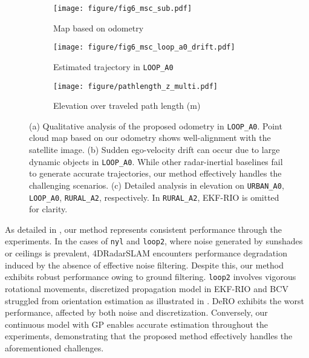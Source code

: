 \begin{figure*}[!t]
    \centering
    \hspace{1mm}
     \begin{subfigure}[b]{0.2\textwidth}
        \centering
        \texttt{[image: figure/fig6\_msc\_sub.pdf]}
        \vspace{-3mm}
        \caption{Map based on odometry}
        \label{subfig:msc_map}
    \end{subfigure}
    \hspace{-1mm}
    \begin{subfigure}[b]{0.43\textwidth}
        \centering
        \texttt{[image: figure/fig6\_msc\_loop\_a0\_drift.pdf]}
        \vspace{-10mm}
        \caption{Estimated trajectory in \texttt{LOOP\_A0}}
        \label{subfig:msc_loopa0_traj}
    \end{subfigure}
    \begin{subfigure}[b]{0.35\textwidth}
        \centering
        \texttt{[image: figure/pathlength\_z\_multi.pdf]}
        \vspace{-2mm}
        \caption{Elevation over traveled path length (m)}
        \label{subfig:msc_elevation}
    \end{subfigure}
    \hspace{-3mm}
    \vspace{-1mm}
    \caption{(a) Qualitative analysis of the proposed odometry in \texttt{LOOP\_A0}. Point cloud map based on our odometry shows well-alignment with the satellite image. (b) Sudden ego-velocity drift can occur due to large dynamic objects in \texttt{LOOP\_A0}. While other radar-inertial baselines fail to generate accurate trajectories, our method effectively handles the challenging scenarios. (c) Detailed analysis in elevation on \texttt{URBAN\_A0}, \texttt{LOOP\_A0}, \texttt{RURAL\_A2}, respectively. In \texttt{RURAL\_A2}, EKF-RIO is omitted for clarity.}
    \label{fig:msc}	
    \vspace{-7mm}
\end{figure*}

As detailed in , our method represents consistent performance through the experiments.
In the cases of \texttt{nyl} and \texttt{loop2}, where noise generated by sunshades or ceilings is prevalent, 4DRadarSLAM encounters performance degradation induced by the absence of effective noise filtering.
Despite this, our method exhibits robust performance owing to ground filtering.
\texttt{loop2} involves vigorous rotational movements, discretized propagation model in EKF-RIO and BCV struggled from orientation estimation as illustrated in . DeRO exhibits the worst performance, affected by both noise and discretization.
Conversely, our continuous model with \ac{GP} enables accurate estimation throughout the experiments, demonstrating that the proposed method effectively handles the aforementioned challenges.

